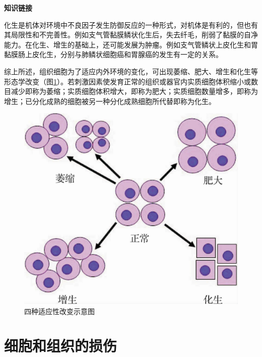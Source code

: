 \begin{center}
	\textbf{知识链接}
\end{center}

化生是机体对环境中不良因子发生防御反应的一种形式，对机体是有利的，但也有其局限性和不完善性。例如支气管黏膜鳞状化生后，失去纤毛，削弱了黏膜的自净能力。在化生、增生的基础上，还可能发展为肿瘤。例如支气管鳞状上皮化生和胃黏膜肠上皮化生，分别与肺鳞状细胞癌和胃腺癌的发生有一定的关系。

综上所述，组织细胞为了适应内外环境的变化，可出现萎缩、肥大、增生和化生等形态学改变（图\ref{fig1-4}）。若刺激因素使发育正常的组织或器官内实质细胞体积缩小或数目减少即称为萎缩；实质细胞体积增大，即称为肥大；实质细胞数量增多，即称为增生；已分化成熟的细胞被另一种分化成熟细胞所代替即称为化生。

\begin{figure}[!htbp]
	\centering
	\includegraphics{./images/Image00005.jpg}
	\caption{四种适应性改变示意图}
	\label{fig1-4}
\end{figure}

\section{细胞和组织的损伤}


